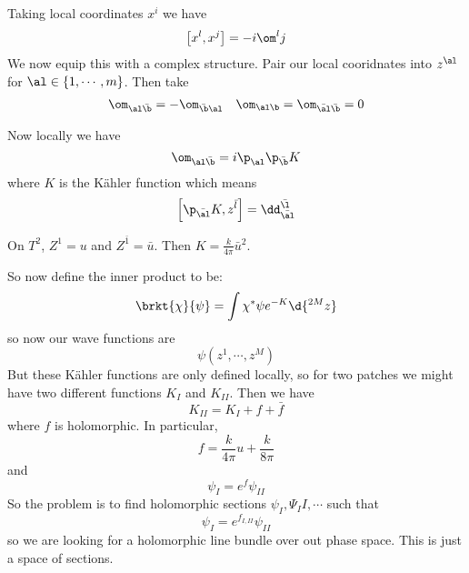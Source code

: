 \documentclass{booc}
\begin{document}
Taking local coordinates $x^i$ we have
\begin{equation}
\left[ x^l , x^j \right] = -i \om^l j
\end{equation}
We now equip this with a complex structure. Pair our local cooridnates 
into $z^\al$ for $\al\in\left\{ 1 , \cdots , m \right\}$. 
Then take
\begin{align}
\om_{\al \bar \b} = - \om_{\bar \b \al}
&&
\om_{\al \b} = \om_{\bar \al \bar \b} = 0
\end{align}

Now locally we have
\begin{equation}
\om_{\al \bar \b} = i \p_\al \p_{\bar \b} K
\end{equation}
where $K$ is the K\"ahler function which means
\begin{equation}
\left[ \p_{\bar \al} K , z^{\bar l} \right] = \dd_{\bar \al}^{\bar \l}
\end{equation}

\begin{exm}
On $T^2$, $Z^1 = u$
and $Z^{\bar 1} = \bar u$. 
Then $K = \frac{k}{4\pi} \bar{u}^2$.
\end{exm}

So now define the inner product to be:
\begin{equation}
\brkt{\chi}{\psi} = \int \chi^* \psi e^{-K} \d{^{2M}z}
\end{equation}
so now our wave functions are
\begin{equation}
\psi\left( z^1 , \cdots , z^M \right)
\end{equation}
But these K\"ahler functions are only defined locally, so for two patches
we might have
two different functions $K_I$ and $K_{II}$.
Then we have
\begin{equation}
K_{II} = K_I + f + \bar f
\end{equation}
where $f$ is holomorphic. 
In particular, 
\begin{equation}
f = \frac{k}{4\pi} u + \frac{k}{8\pi}
\end{equation}
and 
\begin{equation}
\psi_I = e^f \psi_{II}
\end{equation}
So the problem is to find holomorphic sections $\psi_I , \Psi_II , \cdots$
such that
\begin{equation}
\psi_I = e^{f_{I , II}} \psi_{II}
\end{equation}
so we are looking for a holomorphic line bundle over out phase space. 
This is just a space of sections.
\end{document}
